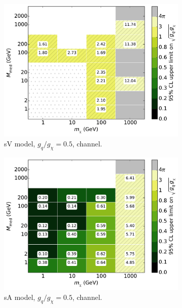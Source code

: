 \begin{figure}
\begin{subfigure}[t]{0.32\textwidth}
    \centering
    \includegraphics[width=1.\textwidth]{figures/grid_basepoints_SVD_rat1_monoWZ.pdf}
    \caption{sV model, $g_q/g_{\chi} = 0.5$, \monoWZ channel.}
    \vspace{0.75cm}
  \end{subfigure}
  \begin{subfigure}[t]{0.32\textwidth}
    \centering
    \includegraphics[width=1.\textwidth]{figures/grid_basepoints_SVD_rat1_monojet.pdf}  %
    \caption{sA model, $g_q/g_{\chi} = 0.5$, \monojet channel.}
  \end{subfigure}
  \begin{subfigure}[t]{0.32\textwidth}
    \centering

\end{subfigure}
\end{figure}
